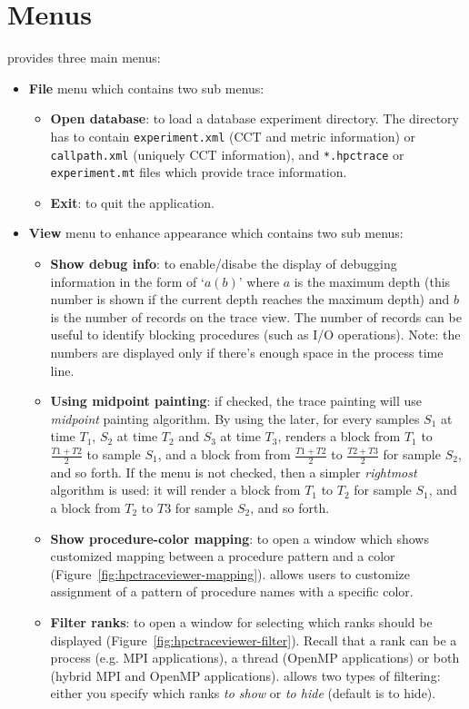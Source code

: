 \section{Menus}
\hpctraceviewer{} provides three main menus:
\begin{itemize}
 \item \textbf{File} menu which contains two sub menus:
 \begin{itemize}
   \item \textbf{Open database}: to load a database experiment directory. The directory has to contain \texttt{experiment.xml} (CCT and metric information) or \texttt{callpath.xml} (uniquely CCT information), and \texttt{*.hpctrace} or \texttt{experiment.mt} files which provide trace information.
   \item \textbf{Exit}: to quit the application.
 \end{itemize}
 \item \textbf{View} menu to enhance appearance which contains two sub menus:
 \begin{itemize}
   \item \textbf{Show debug info}: to enable/disabe the display of debugging information in the form of `$a(b)$' where $a$ is the maximum depth (this number is shown if the current depth reaches the maximum depth) and $b$ is the number of records on the trace view. 
The number of records can be useful to identify blocking procedures (such as I/O operations). Note: the numbers are displayed only if there's enough space in the process time line.
   \item \textbf{Using midpoint painting}: if checked, the trace painting will use \emph{midpoint} painting algorithm. By using the later, for every samples $S_1$ at time $T_1$, $S_2$ at time $T_2$ and $S_3$ at time $T_3$, \hpctraceviewer{} renders a block from $T_1$ to $\frac{T1+T2}{2}$ to sample $S_1$, and a block from from  $\frac{T1+T2}{2}$ to  $\frac{T2+T3}{2}$ for sample $S_2$, and so forth. 
If the menu is not checked, then a simpler \emph{rightmost} algorithm is used: it will render a block from  $T_1$ to $T_2$ for sample $S_1$, and a block from $T_2$ to  $T3$ for sample $S_2$, and so forth.
   \item \textbf{Show procedure-color mapping}: to open a window which shows customized mapping between a procedure pattern and a color (Figure~\ref{fig:hpctraceviewer-mapping}). \hpctraceviewer{} allows users to customize assignment of a pattern of procedure names with a specific color.
   \item \textbf{Filter ranks}: to open a window for selecting which ranks should be displayed (Figure~\ref{fig:hpctraceviewer-filter}). Recall that a rank can be a process (e.g. MPI applications), a thread (OpenMP applications) or both (hybrid MPI and OpenMP applications). \hpctraceviewer{} allows two types of filtering: either you specify which ranks \textit{to show} or \textit{to hide} (default is to hide). 

\end{itemize}
\end{itemize}
